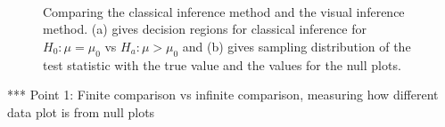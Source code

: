 \documentclass[12]{article}
\begin{document}
%

\begin{figure}[htbp]
\centering
\mbox{\quad
{}}
\caption{Comparing the classical inference method and the visual inference method.  (a) gives decision regions  for classical inference for $H_0: \mu=\mu_0$ vs $H_a:\mu>\mu_0$ and (b) gives sampling distribution of the test statistic with the true value and the values for the null plots.  } 
\label{compare}
\end{figure}


***  Point 1: Finite comparison vs infinite comparison, measuring how different data plot is from null plots
\end{document}

